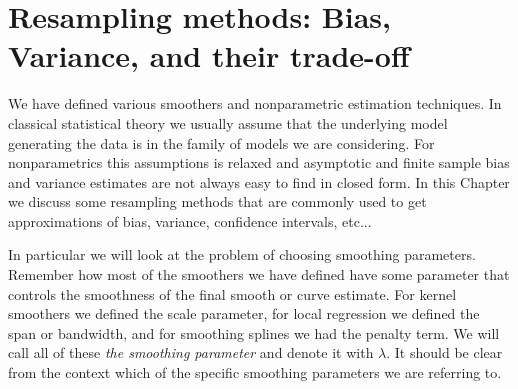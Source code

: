 \chapter{Resampling methods: Bias, Variance, and their trade-off}
We have defined various smoothers and nonparametric estimation
techniques. In classical statistical theory we usually assume that the
underlying model generating the data is in the family of models we
are considering. For nonparametrics this assumptions is relaxed and
asymptotic and finite sample bias and variance 
estimates are not always easy to find in closed form. In this Chapter
we discuss some resampling methods that are commonly used to get
approximations of bias, variance, confidence intervals, etc... 

In particular we will look at the problem of choosing smoothing
parameters. Remember how most of the smoothers we have defined have
some parameter that controls the smoothness of the final smooth or
curve estimate. For kernel smoothers we defined the scale parameter, for
local regression we defined the span or bandwidth, and for smoothing
splines we had the penalty term. We will call all of these {\it
the  smoothing parameter} and denote it with $\lambda$. It should be
clear from the context which of the specific smoothing parameters we
are referring to.




